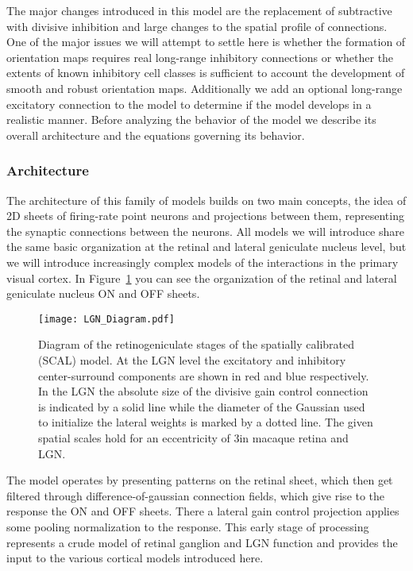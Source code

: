 The major changes introduced in this model are the replacement of
subtractive with divisive inhibition and large changes to the spatial
profile of connections. One of the major issues we will attempt to
settle here is whether the formation of orientation maps requires real
long-range inhibitory connections or whether the extents of known
inhibitory cell classes is sufficient to account the development of
smooth and robust orientation maps. Additionally we add an optional
long-range excitatory connection to the model to determine if the
model develops in a realistic manner. Before analyzing the behavior of
the model we describe its overall architecture and the equations
governing its behavior.

\subsubsection*{Architecture}

The architecture of this family of models builds on two main concepts,
the idea of 2D sheets of firing-rate point neurons and projections
between them, representing the synaptic connections between the
neurons. All models we will introduce share the same basic
organization at the retinal and lateral geniculate nucleus level, but
we will introduce increasingly complex models of the interactions in
the primary visual cortex. In Figure~\ref{LGNDiagram} you can see the
organization of the retinal and lateral geniculate nucleus ON and OFF
sheets.

\begin{figure}
	\centering
        \texttt{[image: LGN\_Diagram.pdf]}
	\caption[Diagram of the SCAL retinogeniculate stage.]{Diagram of
      the retinogeniculate stages of the spatially calibrated (SCAL)
      model. At the LGN level the excitatory and inhibitory
      center-surround components are shown in red and blue
      respectively. In the LGN the absolute size of the divisive gain
      control connection is indicated by a solid line while the
      diameter of the Gaussian used to initialize the lateral weights
      is marked by a dotted line. The given spatial scales hold for an
      eccentricity of 3\degree in macaque retina and LGN.}
	\label{LGNDiagram}
\end{figure}

The model operates by presenting patterns on the retinal sheet, which
then get filtered through difference-of-gaussian connection fields,
which give rise to the response the ON and OFF sheets. There a lateral
gain control projection applies some pooling normalization to the
response. This early stage of processing represents a crude model of
retinal ganglion and LGN function and provides the input to the
various cortical models introduced here.

